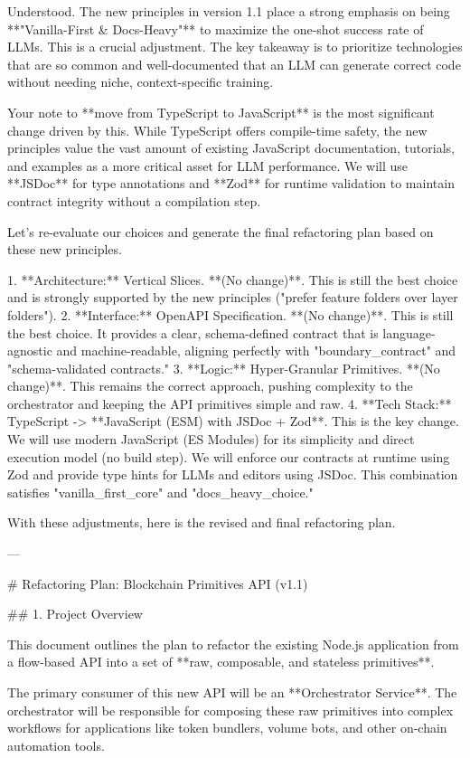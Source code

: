 Understood. The new principles in version 1.1 place a strong emphasis on being **"Vanilla-First & Docs-Heavy"** to maximize the one-shot success rate of LLMs. This is a crucial adjustment. The key takeaway is to prioritize technologies that are so common and well-documented that an LLM can generate correct code without needing niche, context-specific training.

Your note to **move from TypeScript to JavaScript** is the most significant change driven by this. While TypeScript offers compile-time safety, the new principles value the vast amount of existing JavaScript documentation, tutorials, and examples as a more critical asset for LLM performance. We will use **JSDoc** for type annotations and **Zod** for runtime validation to maintain contract integrity without a compilation step.

Let's re-evaluate our choices and generate the final refactoring plan based on these new principles.

1.  **Architecture:** Vertical Slices. **(No change)**. This is still the best choice and is strongly supported by the new principles ("prefer feature folders over layer folders").
2.  **Interface:** OpenAPI Specification. **(No change)**. This is still the best choice. It provides a clear, schema-defined contract that is language-agnostic and machine-readable, aligning perfectly with "boundary_contract" and "schema-validated contracts."
3.  **Logic:** Hyper-Granular Primitives. **(No change)**. This remains the correct approach, pushing complexity to the orchestrator and keeping the API primitives simple and raw.
4.  **Tech Stack:** TypeScript -> **JavaScript (ESM) with JSDoc + Zod**. This is the key change. We will use modern JavaScript (ES Modules) for its simplicity and direct execution model (no build step). We will enforce our contracts at runtime using Zod and provide type hints for LLMs and editors using JSDoc. This combination satisfies "vanilla_first_core" and "docs_heavy_choice."

With these adjustments, here is the revised and final refactoring plan.

---

# Refactoring Plan: Blockchain Primitives API (v1.1)

## 1. Project Overview

This document outlines the plan to refactor the existing Node.js application from a flow-based API into a set of **raw, composable, and stateless primitives**.

The primary consumer of this new API will be an **Orchestrator Service**. The orchestrator will be responsible for composing these raw primitives into complex workflows for applications like token bundlers, volume bots, and other on-chain automation tools.

